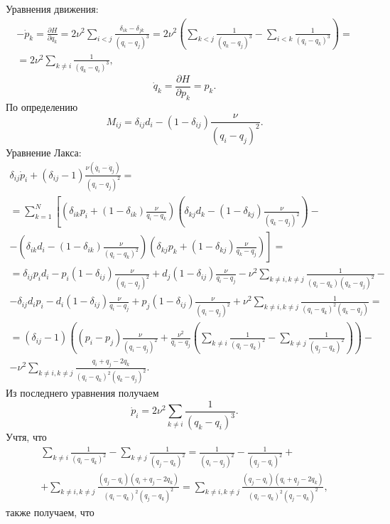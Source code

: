 \documentclass[a4paper]{article}
\begin{document}
\begin{sol}
Уравнения движения:
\begin{multline*}
-\dot{p}_k= \frac{\partial H}{\partial q_k} =
2\nu^2 \sum_{i<j}^{} \frac{\delta_{ik}-\delta_{jk}}{(q_i-q_j)^3}=
2\nu^2 \left( \sum_{k<j}^{} \frac{1}{(q_k-q_j)^3}-
\sum_{i<k}^{} \frac{1}{(q_i-q_k)^3}\right) =\\=
2\nu^2 \sum_{k\neq i}^{} \frac{1}{(q_k-q_i)^3}
,\end{multline*} 
\[
\dot{q}_k= \frac{\partial H}{\partial p_k} =
p_k
.\]
По определению
\[
	M_{ij}= \delta_{ij} d_i -(1-\delta_{ij})\frac{\nu}{(q_i-q_j)^2}
.\] 
Уравнение Лакса:
\begin{multline*}
\delta_{ij}\dot{p}_i+
(\delta_{ij}-1) \frac{\nu \left(\dot{q_i}-\dot{q}_j\right)}{(q_i-q_j)^2}=\\=
\sum_{k=1}^{N} \left[\left( \delta_{ik}p_i +(1-\delta_{ik}) \frac{\nu}{q_i-q_k} \right) \left( 
\delta_{kj} d_k-(1-\delta_{kj}) \frac{\nu}{(q_k-q_j)^2}\right)-
\right.\\-
\left.\left( \delta_{ik}d_i-(1-\delta_{ik})
	\frac{\nu}{(q_i-q_k)^2}\right) \left( \delta_{kj}p_k+(1-\delta_{kj})
\frac{\nu}{q_k-q_j}\right)\right]=\\=
\delta_{ij}p_id_i-
p_i(1-\delta_{ij}) \frac{\nu}{(q_i-q_j)^2}
+d_j(1-\delta_{ij}) \frac{\nu}{q_i-q_j}-
\nu^2\sum_{k\neq i,k \neq j}^{} \frac{1}{
(q_i-q_k)(q_k-q_j)^2}-\\ 
-\delta_{ij}d_ip_i-
d_i(1-\delta_{ij}) \frac{\nu}{q_i-q_j}
+p_j(1-\delta_{ij}) \frac{\nu}{(q_i-q_j)^2}+
\nu^2 \sum_{k\neq i,k\neq j}^{} \frac{1}{(q_i-q_k)^2(q_k-q_j)}=
\\=(\delta_{ij}-1)\left((p_i-p_j) \frac{\nu}{(q_i-q_j)^2}+
\frac{\nu^2}{q_i-q_j}\left(\sum_{k\neq i}^{} \frac{1}{(q_i-q_k)^2}
-\sum_{k\neq j}^{} \frac{1}{(q_j-q_k)^2}\right)\right)-\\-
\nu^2 \sum_{k\neq i,k \neq j}^{}  
\frac{q_i+q_j-2q_k}{(q_i-q_k)^2(q_k-q_j)^2} 
.\end{multline*} 
Из последнего уравнения получаем
\[
	\dot{p}_i=2\nu^2 \sum_{k\neq i}^{} \frac{1}{(q_k-q_i)^3}
.\] 
Учтя, что
\begin{multline*}
	\sum_{k\neq i}^{} \frac{1}{(q_i-q_k)^2}-
	\sum_{k\neq j}^{} \frac{1}{(q_j-q_k)^2}=
	\frac{1}{(q_i-q_j)^2}-
	\frac{1}{(q_j-q_i)^2}+\\+
	\sum_{k\neq i,k\neq j}^{} \frac{(q_j-q_i)(q_i+q_j-2q_k)}{(q_i-q_k)^2
	(q_j-q_k)^2}=
	\sum_{k\neq i,k\neq j}^{} \frac{(q_j-q_i)(q_i+q_j-2q_k)}{(q_i-q_k)^2
	(q_j-q_k)^2}
,\end{multline*} 
также получаем, что

\end{sol}
\end{document}
